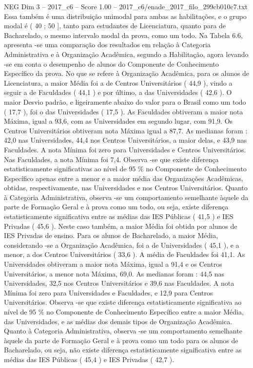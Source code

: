 \begin{textsample}{NEG Dim 3 – 2017\_c6 – Score 1.00 – 2017\_c6/enade\_2017\_filo\_299cb010c7.txt}
Essa também é uma distribuição unimodal para ambas as habilitações, e o grupo modal é ( 40 ; 50 ], tanto para estudantes de Licenciatura, quanto para de Bacharelado, o mesmo intervalo modal da prova, como um todo.
Na Tabela 6.6, apresenta -se uma comparação dos resultados em relação à Categoria Administrativa e à Organização Acadêmica, segundo a Habilitação, agora levando -se em conta o desempenho de alunos do Componente de Conhecimento Específico da prova.
No que se refere à Organização Acadêmica, para os alunos de Licenciatura, a maior Média foi a de Centros Universitários ( 44,9 ), vindo a seguir a de Faculdades ( 44,1 ) e por último, a das Universidades ( 42,6 ).
O maior Desvio padrão, e ligeiramente abaixo do valor para o Brasil como um todo ( 17,7 ), foi o das Universidades ( 17,5 ).
As Faculdades obtiveram a maior nota Máxima, igual a 93,6, com as Universidades em segundo lugar, com 91,9.
Os Centros Universitários obtiveram nota Máxima igual a 87,7.
As medianas foram : 42,0 nas Universidades, 44,4 nos Centros Universitários, a maior delas, e 43,9 nas Faculdades.
A nota Mínima foi zero para Universidades e Centros Universitários.
Nas Faculdades, a nota Mínima foi 7,4.
Observa -se que existe diferença estatisticamente significativas ao nível de 95 \% no Componente de Conhecimento Específico apenas entre a menor e a maior média das Organizações Acadêmicas, obtidas, respectivamente, nas Universidades e nos Centros Universitários.
Quanto à Categoria Administrativa, observa -se um comportamento semelhante àquele da parte de Formação Geral e à prova como um todo, ou seja, existe diferença estatisticamente significativa entre as médias das IES Públicas ( 41,5 ) e IES Privadas ( 45,6 ).
Neste caso também, a maior Média foi obtida por alunos de IES Privadas de ensino.
Para os alunos de Bacharelado, a maior Média, considerando -se a Organização Acadêmica, foi a de Universidades ( 45,1 ), e a menor, a dos Centros Universitários ( 33,6 ).
A média de Faculdades foi 41,1.
As Universidades obtiveram a maior nota Máxima, igual a 91,4 e os Centros Universitários, a menor nota Máxima, 69,0.
As medianas foram : 44,5 nas Universidades, 32,5 nos Centros Universitários e 39,6 nas Faculdades.
A nota Mínima foi zero para Universidades e Faculdades, e 12,9 para Centros Universitários.
Observa -se que existe diferença estatisticamente significativa ao nível de 95 \% no Componente de Conhecimento Específico entre a maior Média, das Universidades, e as médias dos demais tipos de Organização Acadêmica.
Quanto à Categoria Administrativa, observa -se um comportamento semelhante àquele da parte de Formação Geral e à prova como um todo para os alunos de Bacharelado, ou seja, não existe diferença estatisticamente significativa entre as médias das IES Públicas ( 45,4 ) e IES Privadas ( 42,7 ).

\end{textsample}
